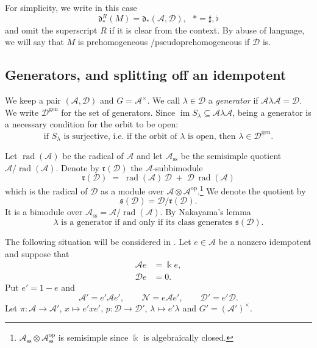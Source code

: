 \documentclass[12pt]{article}
\def\xspace{ }%
\newtheorem{lemma}[lemma]{Lemma}
\theoremstyle{definition}
\newcommand{\prigity}{pseudorigidity\xspace}
\newcommand{\pvs}{prehomogeneous\xspace}
\newcommand{\wpvs}{pseudo\pvs}
\newcommand{\topp}{\mathfrak{s}}
\newcommand{\rbm}{\mathfrak{r}}  %
\newcommand{\sms}{\operatorname{ss}}
\newcommand{\op}{\mathrm{op}}
\newcommand{\kk}{\Bbbk}
\newcommand{\alg}{\mathcal{A}}   %
\newcommand{\bmdl}{\mathcal{D}}   %
\newcommand{\dfr}{\mathfrak{d}}  %
\newcommand{\Sop}{S}
\newcommand{\rsub}{\sharp}       %
\newcommand{\psub}{\flat}        %
\newcommand{\rad}{\operatorname{rad}}
\newcommand{\gen}{\mathrm{gen}}         %
\newcommand{\im}{\operatorname{im}}
\begin{document}
For simplicity, we write in this case
\begin{equation} \label{def:df*M}
\dfr_*^R(M)=\dfr_*(\alg,\bmdl),\ \ \ *=\rsub,\psub
\end{equation}
and omit the superscript $R$ if it is clear from the context.
By abuse of language, we will say that $M$ is \pvs/\wpvs if $\bmdl$ is.

\subsection{Generators, and splitting off an idempotent}\label{ssec:gen}

We keep a pair $(\alg,\bmdl)$ and $G = \alg^\times$.
We call $\lambda \in \bmdl$ a \emph{generator} if $\alg\lambda\alg =\bmdl$.
We write $\bmdl^{\gen}$ for the set of generators.
Since $\im \Sop_\lambda \subseteq \alg\lambda\alg$, being a generator is a
necessary condition for the orbit to be open:
\begin{equation}\label{eq:opengen}
\text{if $\Sop_\lambda$ is surjective, i.e.\ if the orbit of $\lambda$ is
open, then $\lambda \in \bmdl^{\gen}$.}
\end{equation}



Let $\rad(\alg)$ be the radical of $\alg$ and let $\alg_{\sms}$ be the semisimple quotient $\alg/\rad(\alg)$.
Denote by $\rbm(\bmdl)$ the $\alg$-subbimodule
\begin{equation}\label{eq:radbim}
   \rbm(\bmdl) \;=\; \rad(\alg)\,\bmdl \;+\; \bmdl\,\rad(\alg)
\end{equation}
which is the radical of $\bmdl$ as a module over $\alg\otimes\alg^{\op}$.\footnote{$\alg_{\sms}\otimes\alg_{\sms}^{\op}$
is semisimple since $\kk$ is algebraically closed.}
We denote the quotient by
\[
\topp(\bmdl)=\bmdl/\rbm(\bmdl).
\]
It is a bimodule over $\alg_{\sms}=\alg/\rad(\alg)$. By Nakayama's lemma
\begin{equation}\label{eq:nakayama}
\text{$\lambda$ is a generator if and only if its class generates $\topp(\bmdl)$.}
\end{equation}


The following situation will be considered in .
Let $e \in \alg$ be a nonzero idempotent and suppose that
\begin{subequations}\label{eq:cornerax}
\begin{align}
   \alg e &= \kk e , \label{ax:le}\\
   \bmdl e &= 0 . \label{ax:re}
\end{align}
\end{subequations}
Put $e' = 1-e$ and
\begin{equation}\label{eq:cornerpieces}
   \alg' = e'\alg e', \qquad \mathcal N = e\alg e', \qquad \bmdl' = e'\bmdl .
\end{equation}
Let $\pi : \alg\rightarrow\alg'$, $x \mapsto e'xe'$, $p : \bmdl
\rightarrow \bmdl'$, $\lambda\mapsto e'\lambda$ and $G' = (\alg')^\times$.
\end{document}
